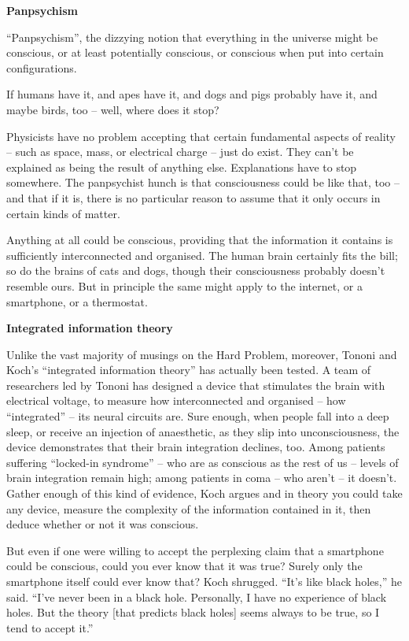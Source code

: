 \documentclass[
]{book}
\begin{document}
\textbf{Panpsychism}

``Panpsychism'', the dizzying notion that everything in the universe might be conscious, or at least potentially conscious, or conscious when put into certain configurations.

If humans have it, and apes have it, and dogs and pigs probably have it, and maybe birds, too -- well, where does it stop?

Physicists have no problem accepting that certain fundamental aspects of reality -- such as space, mass, or electrical charge -- just do exist. They can't be explained as being the result of anything else. Explanations have to stop somewhere. The panpsychist hunch is that consciousness could be like that, too -- and that if it is, there is no particular reason to assume that it only occurs in certain kinds of matter.

Anything at all could be conscious, providing that the information it contains is sufficiently interconnected and organised. The human brain certainly fits the bill; so do the brains of cats and dogs, though their consciousness probably doesn't resemble ours. But in principle the same might apply to the internet, or a smartphone, or a thermostat.

\textbf{Integrated information theory}

Unlike the vast majority of musings on the Hard Problem, moreover, Tononi and Koch's ``integrated information theory'' has actually been tested. A team of researchers led by Tononi has designed a device that stimulates the brain with electrical voltage, to measure how interconnected and organised -- how ``integrated'' -- its neural circuits are. Sure enough, when people fall into a deep sleep, or receive an injection of anaesthetic, as they slip into unconsciousness, the device demonstrates that their brain integration declines, too. Among patients suffering ``locked-in syndrome'' -- who are as conscious as the rest of us -- levels of brain integration remain high; among patients in coma -- who aren't -- it doesn't. Gather enough of this kind of evidence, Koch argues and in theory you could take any device, measure the complexity of the information contained in it, then deduce whether or not it was conscious.

But even if one were willing to accept the perplexing claim that a smartphone could be conscious, could you ever know that it was true? Surely only the smartphone itself could ever know that? Koch shrugged. ``It's like black holes,'' he said. ``I've never been in a black hole. Personally, I have no experience of black holes. But the theory {[}that predicts black holes{]} seems always to be true, so I tend to accept it.''
\end{document}

